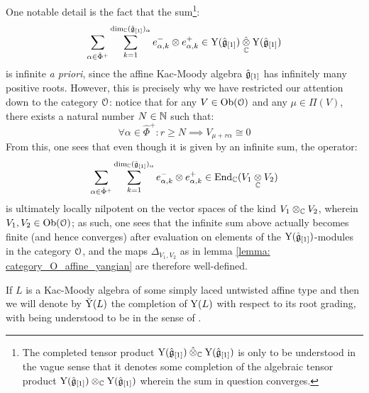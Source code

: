         \begin{remark}
            One notable detail is the fact that the sum\footnote{The completed tensor product $\rmY(\hat{\g}_{[1]}) \hattensor_{\bbC} \rmY(\hat{\g}_{[1]})$ is only to be understood in the vague sense that it denotes some completion of the algebraic tensor product $\rmY(\hat{\g}_{[1]}) \tensor_{\bbC} \rmY(\hat{\g}_{[1]})$ wherein the sum in question converges.}:
                $$\sum_{\alpha \in \hat{\Phi}^+} \sum_{k = 1}^{ \dim_{\bbC} (\hat{\g}_{[1]})_{\alpha} } e_{\alpha, k}^- \tensor e_{\alpha, k}^+ \in \rmY(\hat{\g}_{[1]}) \hattensor_{\bbC} \rmY(\hat{\g}_{[1]})$$
            is infinite \textit{a priori}, since the affine Kac-Moody algebra $\hat{\mathfrak{g}}_{[1]}$ has infinitely many positive roots. However, this is precisely why we have restricted our attention down to the category $\mathcal{O}$: notice that for any $V \in \mathrm{Ob}(\mathcal{O})$ and any $\mu \in \Pi(V)$, there exists a natural number $N \in \mathbb{N}$ such that:
                $$\forall \alpha \in \hat{\Phi}^+: r \geq N \implies V_{\mu + r \alpha} \cong 0$$
            From this, one sees that even though it is given by an infinite sum, the operator:
                $$\sum_{\alpha \in \hat{\Phi}^+} \sum_{k = 1}^{ \dim_{\bbC} (\hat{\g}_{[1]})_{\alpha} } e_{\alpha, k}^- \tensor e_{\alpha, k}^+ \in \End_{\bbC}(V_1 \tensor_{\bbC} V_2)$$
            is ultimately locally nilpotent on the vector spaces of the kind $V_1 \tensor_{\bbC} V_2$, wherein $V_1, V_2 \in \mathrm{Ob}(\mathcal{O})$; as such, one sees that the infinite sum above actually becomes finite (and hence converges) after evaluation on elements of the $\mathrm{Y}(\hat{\mathfrak{g}}_{[1]})$-modules in the category $\mathcal{O}$, and the maps $\Delta_{V_1, V_2}$ as in lemma \ref{lemma: category_O_affine_yangian} are therefore well-defined. 
        \end{remark}
        \begin{convention}
            If $L$ is a Kac-Moody algebra of some simply laced untwisted affine type and then we will denote by $\breve{\mathrm{Y}}(L)$ the completion of $\mathrm{Y}(L)$ with respect to its root grading, with  being understood to be in the sense of \cite[Appendix A]{wendlandt_formal_shift_operators_on_yangian_doubles}.
        \end{convention}
